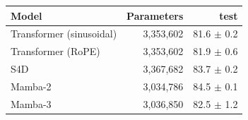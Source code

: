 \begin{tabular}{lrr}
\toprule
Model & Parameters & test \\
\midrule
Transformer (sinusoidal) & 3,353,602 & 81.6 $\pm$ 0.2 \\
Transformer (RoPE) & 3,353,602 & 81.9 $\pm$ 0.6 \\
S4D & 3,367,682 & 83.7 $\pm$ 0.2 \\
Mamba-2 & 3,034,786 & 84.5 $\pm$ 0.1 \\
Mamba-3 & 3,036,850 & 82.5 $\pm$ 1.2 \\
\bottomrule
\end{tabular}
\par{}
